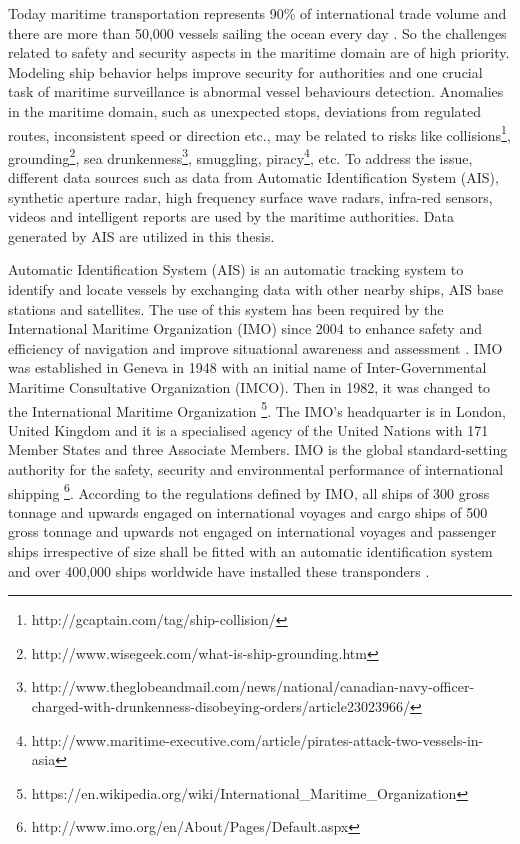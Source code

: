 \documentclass[12pt,glossary]{dalcsthesis}
\begin{document}
Today maritime transportation represents 90\% of international trade volume \cite{vespe12} and there are more than 50,000 vessels sailing the ocean every day \cite{Nicolas}. So the challenges related to safety and security aspects in the maritime domain are of high priority. 
Modeling ship behavior helps improve security for authorities and one crucial task of maritime surveillance is abnormal vessel behaviours detection.
Anomalies in the maritime domain, such as unexpected stops, deviations from regulated routes, inconsistent speed or direction etc., may be related to risks like collisions\footnote{http://gcaptain.com/tag/ship-collision/}, grounding\footnote{http://www.wisegeek.com/what-is-ship-grounding.htm}, sea drunkenness\footnote{http://www.theglobeandmail.com/news/national/canadian-navy-officer-charged-with-drunkenness-disobeying-orders/article23023966/},  smuggling, piracy\footnote{http://www.maritime-executive.com/article/pirates-attack-two-vessels-in-asia}, etc. To address the issue, different data sources such as data from Automatic Identification System (AIS), synthetic aperture radar, high frequency surface wave radars, infra-red sensors, videos and intelligent reports \cite{masterthesis} are used by the maritime authorities.   Data generated by AIS are utilized in this thesis. 

Automatic Identification System (AIS) is an automatic tracking system to identify and locate vessels by exchanging data with other nearby ships, AIS base stations and satellites. The use of this system has been required by the International Maritime Organization (IMO) since 2004 to enhance safety and efficiency of navigation and improve situational awareness and assessment \cite{AISHarati}. IMO was established in Geneva in 1948 with an initial name of Inter-Governmental Maritime Consultative Organization (IMCO). Then in 1982, it was changed to the International Maritime Organization \footnote{https://en.wikipedia.org/wiki/International\_Maritime\_Organization}. The IMO's headquarter is in London, United Kingdom and it is a specialised agency of the United Nations with 171 Member States and three Associate Members. IMO is the global standard-setting authority for the safety, security and environmental performance of international shipping \footnote{http://www.imo.org/en/About/Pages/Default.aspx}.
According to the regulations defined by IMO, all ships of 300 gross tonnage and upwards engaged on international voyages and cargo ships of 500 gross tonnage and upwards not engaged on international voyages and passenger ships irrespective of size shall be fitted with an automatic identification system and over 400,000 ships worldwide have installed these transponders \cite{AISdummies}. 
\end{document}
